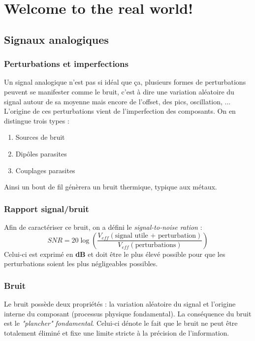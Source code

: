 \chapter{Welcome to the real world!}

\section{Signaux analogiques}
\subsection{Perturbations et imperfections}
Un signal analogique n'est pas si idéal que ça, plusieurs formes de perturbations peuvent se manifester comme le bruit, c'est à dire une variation aléatoire du signal autour de sa moyenne mais encore de l'offset, des pics, oscillation, ...\\
L'origine de ces perturbations vient de l'imperfection des composants. On en distingue trois types :
\begin{enumerate}
	\item Sources de bruit
	\item Dipôles parasites
	\item Couplages parasites
\end{enumerate}
Ainsi un bout de fil génèrera un bruit thermique, typique aux métaux.

\subsection{Rapport signal/bruit}
Afin de caractériser ce bruit, on a défini le \textit{signal-to-noise ration} :
\begin{equation}
	SNR = 20\log\left(\dfrac{V_{eff}(\text{signal utile + perturbation})}{V_{eff}(\text{perturbations})} \right)
\end{equation}
Celui-ci est exprimé en \textbf{dB} et doit être le plus élevé possible pour que les perturbations soient les plus négligeables possibles.

\subsection{Bruit}
Le bruit possède deux propriétés : la variation aléatoire du signal et l'origine interne du composant (processus physique fondamental). La conséquence du bruit est le \textit{"plancher" fondamental}. Celui-ci dénote le fait que le bruit ne peut être totalement éliminé et fixe une limite stricte à la précision de l'information.


